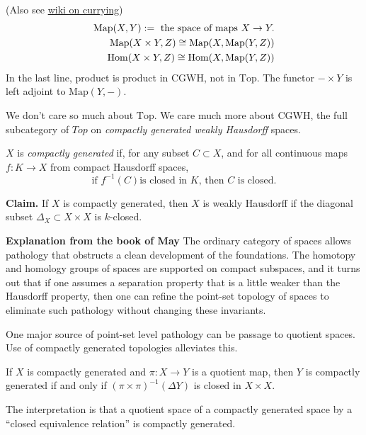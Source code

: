 (Also see
\href{https://en.wikipedia.org/wiki/%
Currying#Function_spaces}{wiki
on currying})
$$
\begin{aligned}
\text{Map}(X,Y):=\text{ the space of maps
}X\to Y.\\
\text{Map}(X\times
Y,Z)\cong\text{Map}(X,\text{Map}(Y,Z))\\
\mathop{\mathrm{Hom}}\nolimits(X\times Y,Z)\cong
\mathop{\mathrm{Hom}}\nolimits(X,\text{Map}(Y,Z))
\end{aligned}
$$
In the last line, product is product in
$\text{CGWH}$, not in $\text{Top}$.
The functor $-\times Y$ is left adjoint to
$\text{Map}(Y,-)$.

We don't care so much about $\text{Top}$. We
care much more about $\text{CGWH}$,
the full subcategory of $\mathit{Top}$ on
 {\it compactly generated weakly Hausdorff}
 spaces.

\begin{definition}
\label{definition-is-this-right}
$X$ is {\it compactly generated} if, for any
subset $C\subset X$, and for all continuous
maps $f:K\to X$ from compact Hausdorff
spaces, $$\text{if } f^{-1}(C) \text{is
closed in }K\text{, then } C\text{ is
closed}.$$
\end{definition}
{\bf Claim.}
If $X$ is compactly generated, then $X$ is
weakly Hausdorff if the diagonal subset
$\Delta_X\subset X\times X$ is $k$-closed.


{\bf Explanation from the book of May}
The ordinary category of spaces
allows pathology that obstructs a clean
development of the foundations.
The homotopy and homology groups of spaces
are supported on compact subspaces, and
it turns out that if one assumes a separation
property
that is a little weaker
than the Hausdorff property,
then one can refine the point-set topology of
spaces to eliminate
such pathology without changing these
invariants.

One major source of point-set level pathology
can be passage to quotient spaces.
Use of compactly generated topologies
alleviates this.

\begin{proposition}
\label{proposition-if-x-compa-gener-x-y}
If $X$ is compactly generated and $\pi:X\to
Y$ is a quotient map,
then $Y$ is compactly generated if and only
if $(\pi\times \pi)^{-1}(\Delta Y)$
 is closed in $X\times X$.
\end{proposition}

\noindent
The interpretation is that a quotient space
of a
compactly generated space by a “closed
equivalence relation”
is compactly generated.

